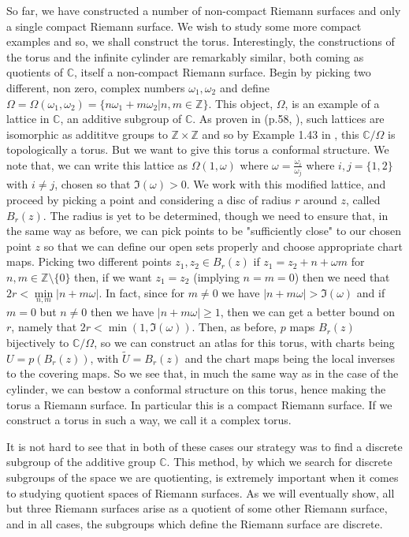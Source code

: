 \documentclass[11pt]{report}
\theoremstyle{definition}
\begin{document}
So far, we have constructed a number of non-compact Riemann surfaces and only a single compact Riemann surface. We wish to study some more compact examples and so, we shall construct the torus. Interestingly, the constructions of the torus and the infinite cylinder are remarkably similar, both coming as quotients of $\mathbb{C}$, itself a non-compact Riemann surface. 
Begin by picking two different, non zero, complex numbers $\omega_1, \omega_2$ and define $\Omega = \Omega(\omega_1,\omega_2) = \{n\omega_1 + m\omega_2 \vert n,m \in \mathbb{Z} \}$. This object, $\Omega$, is an example of a lattice in $\mathbb{C}$, an additive subgroup of $\mathbb{C}$. As proven in (p.58, \cite{comfun}), such lattices are isomorphic as addititve groups to $\mathbb{Z} \times \mathbb{Z}$ and so by Example 1.43 in \cite{Hatchers}, this $\mathbb{C}/\Omega$ is topologically a torus. But we want to give this torus a conformal structure. We note that, we can write this lattice as $\Omega(1,\omega)$ where $\omega=\frac{\omega_i}{\omega_j}$ where $i,j = \{1, 2\}$ with $i \neq j$, chosen so that $\Im(\omega) > 0$. We work with this modified lattice, and proceed by picking a point and considering a disc of radius $r$ around $z$, called $B_r(z)$. The radius is yet to be determined, though we need to ensure that, in the same way as before, we can pick points to be "sufficiently close" to our chosen point $z$ so that we can define our open sets properly and choose appropriate chart maps. Picking two different points $z_1,z_2 \in B_r(z)$ if $z_1 = z_2 + n + \omega m$ for $n,m \in \mathbb{Z}\setminus \{0\}$ then, if we want $z_1=z_2$ (implying $n=m=0$) then we need that $2r < \min\limits_{n,m}|n + m\omega|$. In fact, since for $m \neq 0$ we have $|n+m\omega| > \Im(\omega)$ and if $m=0$ but $n\neq 0$ then we have $|n + m\omega| \geq 1$, then we can get a better bound on $r$, namely that $2r < \min(1, \Im(\omega))$. Then, as before, $p$ maps $B_r(z)$ bijectively to $\mathbb{C}/\Omega$, so we can construct an atlas for this torus, with charts being $U = p(B_r(z))$, with $\tilde{U} = B_r(z)$ and the chart maps being the local inverses to the covering maps. So we see that, in much the same way as in the case of the cylinder, we can bestow a conformal structure on this torus, hence making the torus a Riemann surface. In particular this is a compact Riemann surface. If we construct a torus in such a way, we call it a complex torus.

It is not hard to see that in both of these cases our strategy was to find a discrete subgroup of the additive group $\mathbb{C}$. This method, by which we search for discrete subgroups of the space we are quotienting, is extremely important when it comes to studying quotient spaces of Riemann surfaces. As we will eventually show, all but three Riemann surfaces arise as a quotient of some other Riemann surface, and in all cases, the subgroups which define the Riemann surface are discrete. 
\end{document}
